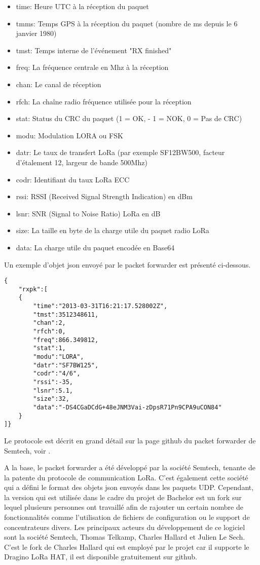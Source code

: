 \begin{itemize}
\item time: Heure UTC à la réception du paquet
\item tmms: Temps GPS à la réception du paquet (nombre de ms depuis le 6 janvier 1980)
\item tmst: Temps interne de l'événement "RX finished"
\item freq: La fréquence centrale en Mhz à la réception
\item chan: Le canal de réception
\item rfch: La chaîne radio fréquence utilisée pour la réception
\item stat: Status du CRC du paquet (1 = OK, - 1 = NOK, 0 = Pas de CRC)
\item modu: Modulation LORA ou FSK
\item datr: Le taux de transfert LoRa (par exemple SF12BW500, facteur d'étalement 12, largeur de bande 500Mhz)
\item codr: Identifiant du taux LoRa ECC
\item rssi: RSSI (Received Signal Strength Indication) en dBm
\item lsnr: SNR (Signal to Noise Ratio) LoRa en dB
\item size: La taille en byte de la charge utile du paquet radio LoRa
\item data: La charge utile du paquet encodée en Base64
\end{itemize}

Un exemple d'objet json envoyé par le packet forwarder est présenté ci-dessous.

\begin{lstlisting}
{
	"rxpk":[
	{
		"time":"2013-03-31T16:21:17.528002Z",
		"tmst":3512348611,
		"chan":2,
		"rfch":0,
		"freq":866.349812,
		"stat":1,
		"modu":"LORA",
		"datr":"SF7BW125",
		"codr":"4/6",
		"rssi":-35,
		"lsnr":5.1,
		"size":32,
		"data":"-DS4CGaDCdG+48eJNM3Vai-zDpsR71Pn9CPA9uCON84"
	}
]}
\end{lstlisting}

Le protocole est décrit en grand détail sur la page github du packet forwarder de Semtech, voir \cite{lora-pkt-forwarder-protocol}.

A la base, le packet forwarder a été développé par la société Semtech, tenante de la patente du protocole de communication LoRa. C’est également cette société qui a défini le format des objets json envoyés dans les paquets UDP. Cependant, la version qui est utilisée dans le cadre du projet de Bachelor est un fork sur lequel plusieurs personnes ont travaillé afin de rajouter un certain nombre de fonctionnalités comme l'utilisation de fichiers de configuration ou le support de concentrateurs divers. Les principaux acteurs du développement de ce logiciel sont la société Semtech, Thomas Telkamp, Charles Hallard et Julien Le Sech. C'est le fork de Charles Hallard qui est employé par le projet car il supporte le Dragino LoRa HAT, il est disponible gratuitement sur github. \cite{pkt-forwarder-hallard}

